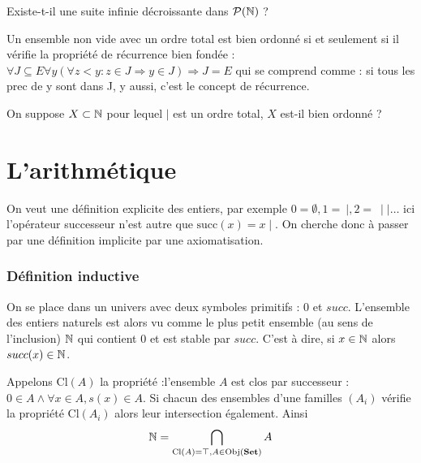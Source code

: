 \documentclass{report}
\begin{document}
\begin{exo}
    Existe-t-il une suite infinie décroissante dans \(\mathcal{P}(\mathbb{N})\) ?
\end{exo}

\begin{proposition}
    Un ensemble non vide avec un ordre total est bien ordonné si et seulement si il
    vérifie la propriété de récurrence bien fondée :
    \(\forall J\subseteq E\forall y(\forall z<y\colon z\in J\Rightarrow y\in J)\Rightarrow J=E\)
    qui se comprend comme : si tous les prec de y sont dans J, y aussi, c'est le concept
    de récurrence.
\end{proposition}

\begin{exo}
    On suppose \(X\subset \mathbb{N}\) pour lequel \(|\) est un ordre total, \(X\) est-il
    bien ordonné ?
\end{exo}

\chapter{L'arithmétique}
\setcounter{exo}{0}

On veut une définition explicite des entiers, par exemple
\(0=\emptyset, 1 =\ \mid, 2 =\ \mid\mid\dots\) ici l'opérateur successeur n'est
autre que \(\text{succ}(x)=x\mid\). On cherche donc à passer par une définition
implicite par une axiomatisation.

\subsection*{Définition inductive}
On se place dans un univers avec deux symboles primitifs : \(0\) et \(succ\).
L'ensemble des entiers naturels est alors vu comme le plus petit ensemble (au
sens de l'inclusion) \(\mathbb{N}\) qui contient \(0\) et est stable par \(succ\). C'est
à dire, si \(x\in\mathbb{N}\) alors \(succ(x)\in\mathbb{N}\).


Appelons \(\text{Cl}(A)\) la propriété :l'ensemble \(A\) est clos par successeur :
\(0\in A\land \forall x\in A, s(x)\in A\). Si chacun des ensembles d'une familles \((A_i)\)
vérifie la propriété \(\text{Cl}(A_i)\) alors leur intersection également. Ainsi
\[\mathbb{N} = \bigcap_{\text{Cl}(A)=\top,A\in\textrm{Obj}(\textbf{Set})} A\]
\end{document}

